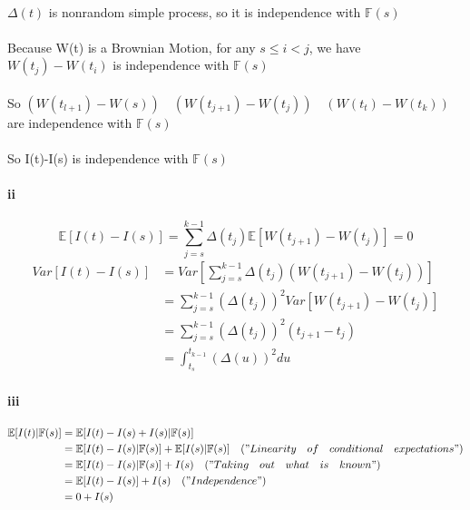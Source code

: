 \documentclass{article}
\begin{document}
\paragraph{}{$\Delta(t)$ is nonrandom simple process, so it is independence with $\mathbb{F}(s)$}
\paragraph{}{Because W(t) is a Brownian Motion, for any $s\le i < j$, we have $W(t_j)-W(t_i)$ is independence with  $\mathbb{F}(s)$ }
\paragraph{}{So $(W(t_{l+1}) -W(s))\quad (W(t_{j+1})-W(t_{j}))\quad (W(t_{t}) -W(t_k))$ are independence with $\mathbb{F}(s)$  }
\paragraph{}{So I(t)-I(s) is independence with $\mathbb{F}(s)$ }
\paragraph{ii}
\begin{displaymath}
  \mathbb{E}[I(t)-I(s)]=\sum_{j=s}^{k-1}\Delta(t_j)\mathbb{E}[W(t_{j+1})-W(t_{j})]=0
\end{displaymath}
\begin{align*}
  Var[I(t)-I(s)] & =Var[\sum_{j=s}^{k-1}\Delta(t_j)(W(t_{j+1})-W(t_{j}))]\\
  &=\sum_{j=s}^{k-1}(\Delta(t_j))^2Var[W(t_{j+1})-W(t_{j})]\\
   & =\sum_{j=s}^{k-1}(\Delta(t_j))^2(t_{j+1}-t_{j})\\
   &=\int_{t_s}^{t_{k-1}}(\Delta(u))^2du
\end{align*}
\paragraph{iii}
\begin{align*}
  \mathbb{E}[I(t)|\mathbb{F}(s)] &= \mathbb{E}[I(t)-I(s)+I(s)|\mathbb{F}(s)] \\
   & = \mathbb{E}[I(t)-I(s)|\mathbb{F}(s)]+\mathbb{E}[I(s)|\mathbb{F}(s)]\quad("Linearity \quad of\quad conditional \quad expectations")\\
   & =\mathbb{E}[I(t)-I(s)|\mathbb{F}(s)]+I(s)\quad("Taking\quad out\quad what \quad is \quad known")\\
   & = \mathbb{E}[I(t)-I(s)]+I(s)\quad("Independence")\\
   & = 0+I(s)
\end{align*}
\end{document}

